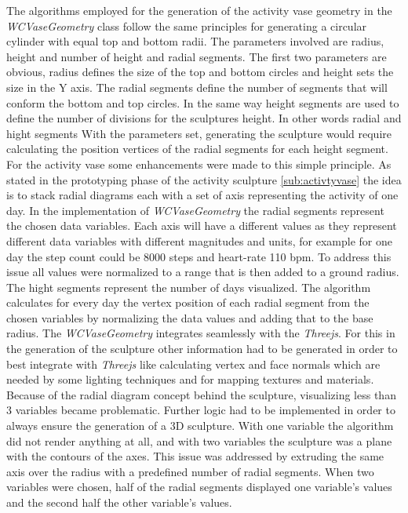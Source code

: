 \documentclass[../medieninformatik-arbeit.tex]{subfiles}
\begin{document}
The algorithms employed for the generation of the activity vase geometry in the \textit{WCVaseGeometry} class follow the same principles for generating a circular cylinder with equal top and bottom radii. The parameters involved are radius, height and number of height and radial segments. The first two parameters are obvious, radius defines the size of the top and bottom circles and height sets the size in the Y axis. The radial segments define the number of segments that will conform the bottom and top circles. In the same way height segments are used to define the number of divisions for the sculptures height. In other words radial and hight segments  With the parameters set, generating the sculpture would require calculating the position vertices of the radial segments for each height segment. For the activity vase some enhancements were made to this simple principle. As stated in the prototyping phase of the activity sculpture \ref{sub:activtyvase} the idea is to stack radial diagrams each with a set of axis representing the activity of one day. In the implementation of \textit{WCVaseGeometry} the radial segments represent the chosen data variables. Each axis will have a different values as they represent different data variables with different magnitudes and units, for example for one day the step count could be 8000 steps and heart-rate 110 bpm. To address this issue all values were normalized to a range that is then added to a ground radius. The hight segments represent the number of days visualized. The algorithm calculates for every day the vertex position of each radial segment from the chosen variables by normalizing the data values and adding that to the base radius. The \textit{WCVaseGeometry} integrates seamlessly with the \textit{Threejs}. For this in the generation of the sculpture other information had to be generated in order to best integrate with \textit{Threejs} like calculating vertex and face normals which are needed by some lighting techniques and for mapping textures and materials. Because of the radial diagram concept behind the sculpture, visualizing less than 3 variables became problematic. Further logic had to be implemented in order to always ensure the generation of a 3D sculpture. With one variable the algorithm did not render anything at all, and with two variables the sculpture was a plane with the contours of the axes. This issue was addressed by extruding the same axis over the radius with a predefined number of radial segments. When two variables were chosen, half of the radial segments displayed one variable's values and the second half the other variable's values.  
\end{document}
